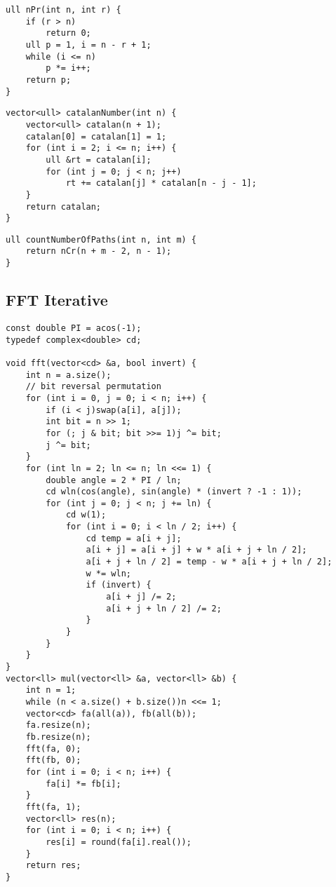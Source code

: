 \begin{lstlisting}[style=cpp]
ull nPr(int n, int r) {  
    if (r > n)  
        return 0;  
    ull p = 1, i = n - r + 1;  
    while (i <= n)  
        p *= i++;  
    return p;  
}
\end{lstlisting}

\begin{lstlisting}[style=cpp]
vector<ull> catalanNumber(int n) {  
    vector<ull> catalan(n + 1);  
    catalan[0] = catalan[1] = 1;  
    for (int i = 2; i <= n; i++) {  
        ull &rt = catalan[i];  
        for (int j = 0; j < n; j++)  
            rt += catalan[j] * catalan[n - j - 1];  
    }  
    return catalan;  
}
\end{lstlisting}

\begin{lstlisting}[style=cpp]
ull countNumberOfPaths(int n, int m) {  
    return nCr(n + m - 2, n - 1);  
}
\end{lstlisting}

\subsection{FFT Iterative}

\begin{lstlisting}[style=cpp]
const double PI = acos(-1);
typedef complex<double> cd;
 
void fft(vector<cd> &a, bool invert) {
    int n = a.size();
    // bit reversal permutation
    for (int i = 0, j = 0; i < n; i++) {
        if (i < j)swap(a[i], a[j]);
        int bit = n >> 1;
        for (; j & bit; bit >>= 1)j ^= bit;
        j ^= bit;
    }
    for (int ln = 2; ln <= n; ln <<= 1) {
        double angle = 2 * PI / ln;
        cd wln(cos(angle), sin(angle) * (invert ? -1 : 1));
        for (int j = 0; j < n; j += ln) {
            cd w(1);
            for (int i = 0; i < ln / 2; i++) {
                cd temp = a[i + j];
                a[i + j] = a[i + j] + w * a[i + j + ln / 2];
                a[i + j + ln / 2] = temp - w * a[i + j + ln / 2];
                w *= wln;
                if (invert) {
                    a[i + j] /= 2;
                    a[i + j + ln / 2] /= 2;
                }
            }
        }
    }
}
vector<ll> mul(vector<ll> &a, vector<ll> &b) {
    int n = 1;
    while (n < a.size() + b.size())n <<= 1;
    vector<cd> fa(all(a)), fb(all(b));
    fa.resize(n);
    fb.resize(n);
    fft(fa, 0);
    fft(fb, 0);
    for (int i = 0; i < n; i++) {
        fa[i] *= fb[i];
    }
    fft(fa, 1);
    vector<ll> res(n);
    for (int i = 0; i < n; i++) {
        res[i] = round(fa[i].real());
    }
    return res;
}
\end{lstlisting}

